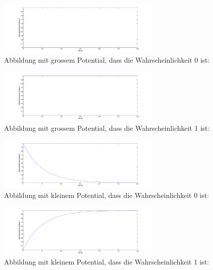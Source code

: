 \begin{refsection}
\begin{figure}
\centering
\includegraphics[width=0.7\textwidth]{flash/graphics/PotentialgrossZ0.pdf}
\caption{Abbildung mit grossem Potential, dass die Wahrscheinlichkeit 0 ist:
\label{skript:PotentialgrossZ0}}
\end{figure}
\begin{figure}
\centering
\includegraphics[width=0.7\textwidth]{flash/graphics/PotentialgrossZ1.pdf}
\caption{Abbildung mit grossem Potential, dass die Wahrscheinlichkeit 1 ist:
\label{skript:PotentialgrossZ1}}
\end{figure}

\begin{figure}
\centering
\includegraphics[width=0.7\textwidth]{flash/graphics/PotentialkleinZ0.pdf}
\caption{Abbildung mit kleinem Potential, dass die Wahrscheinlichkeit 0 ist:
\label{skript:PotentialkleinZ0}}
\end{figure}
\begin{figure}
\centering
\includegraphics[width=0.7\textwidth]{flash/graphics/PotentialkleinZ1.pdf}
\caption{Abbildung mit kleinem Potential, dass die Wahrscheinlichkeit 1 ist:
\label{skript:PotentialkleinZ1}}
\end{figure}

\printbibliography[heading=subbibliography]
\end{refsection}

